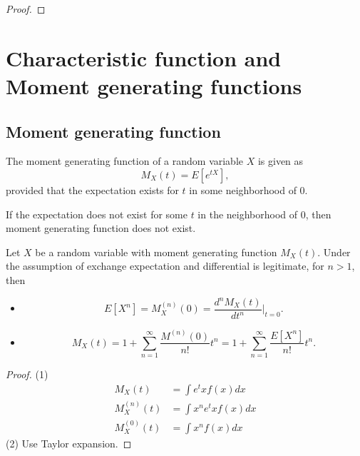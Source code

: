 \begin{refsection}
\begin{proof}
\end{proof}







\section{Characteristic function and Moment generating functions}
\subsection{Moment generating function}
\begin{definition}\cite[62]{casella2002statistical}
The moment generating function of a random variable $X$ is given as
$$M_X(t) = E[e^{tX}],$$
provided that the expectation exists for $t$ in some neighborhood of 0.
\end{definition}

\begin{remark}
If the expectation does not exist for some $t$ in the neighborhood of 0, then moment generating function does not exist.
\end{remark}



\begin{lemma}\cite[62]{casella2002statistical}\label{ch:theory-of-probability:th:GeneratingMomentsUsingMomentGeneratingFunction}
Let $X$ be a random variable with moment generating function $M_X(t)$. Under the assumption of exchange expectation and differential is legitimate, for $n>1$, then
\begin{itemize}
	\item $$E[X^n]=M_X^{(n)}(0) = \frac{d^n M_X(t)}{dt^n}|_{t=0}.$$
	\item $$M_X(t) = 1 + \sum_{n=1}^{\infty} \frac{M^{(n)}(0)}{n!}t^n = 1 + \sum_{n=1}^{\infty} \frac{E[X^n]}{n!}t^n.$$
\end{itemize}

\end{lemma}
\begin{proof}
(1)	
	\begin{align*}
	M_X(t) &= \int e^tx f(x) dx \\
	M_X^{(n)}(t) &= \int x^ne^tx f(x) dx \\
	M_X^{(0)}(t) &= \int x^n f(x) dx
	\end{align*}
(2) Use Taylor expansion.	
\end{proof}


\end{refsection}
